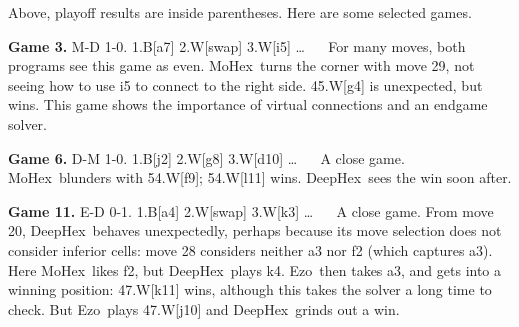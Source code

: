 \documentclass{icga}
\def\Dx{\mbox{\sc DeepHex}}
\def\Eo{\mbox{\sc Ezo}}
\def\Mx{\mbox{\sc MoHex}}
\begin{document}
Above, playoff results are inside parentheses.
Here are some selected games.


{\bf Game 3.}
{\sc M-D 1-0.}
1.B[a7] 2.W[swap] 3.W[i5] \ldots ~ ~
For many moves, both programs see this game as even.
\Mx\ turns the corner with move 29, 
not seeing how to use i5 to connect to the right side.
45.W[g4] is unexpected, but wins.
This game shows the importance of virtual connections and
an endgame solver.



{\bf Game 6.}
{\sc D-M 1-0.}
1.B[j2] 2.W[g8] 3.W[d10] \ldots ~ ~
A close game. 
\Mx\ blunders with 54.W[f9]; 54.W[l11] wins.
\Dx\ sees the win soon after.



%
%
%

{\bf Game 11.}
{\sc E-D 0-1.}
1.B[a4] 2.W[swap] 3.W[k3] \ldots ~ ~ 
A close game. From move 20, \Dx\ behaves unexpectedly,
perhaps because its move selection does not consider inferior cells:
move 28 considers neither a3 nor f2 (which captures a3).
Here \Mx\ likes f2, but \Dx\ plays k4.
\Eo\ then takes a3, and gets into a winning position:
47.W[k11] wins, although this takes the solver a long time to check.
But \Eo\ plays 47.W[j10] and \Dx\ grinds out a win.
\end{document}
